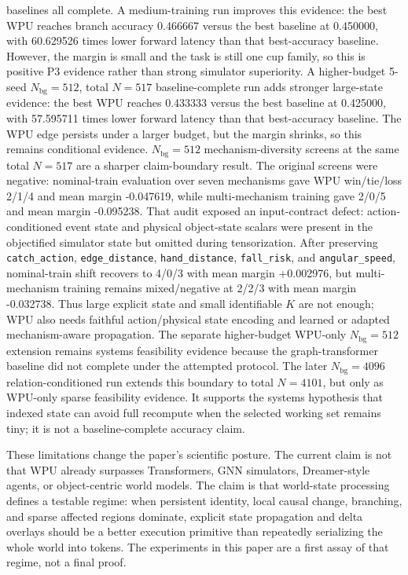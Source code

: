 \documentclass[11pt]{article}
\begin{document}
baselines all complete. A medium-training run improves this evidence: the best
WPU reaches branch accuracy 0.466667 versus the best baseline at 0.450000, with
60.629526 times lower forward latency than that best-accuracy baseline.
However, the margin is small and the task is still one cup family, so this is
positive P3 evidence rather than strong simulator superiority. A higher-budget
5-seed \(N_{\mathrm{bg}}=512\), total \(N=517\) baseline-complete run adds
stronger large-state evidence: the best WPU reaches 0.433333 versus the best
baseline at 0.425000, with 57.595711 times lower forward latency than that
best-accuracy baseline. The WPU edge persists under a larger budget, but the
margin shrinks, so this remains conditional evidence.
\(N_{\mathrm{bg}}=512\) mechanism-diversity screens at the same total \(N=517\)
are a sharper claim-boundary result. The original screens were negative:
nominal-train evaluation over seven mechanisms gave WPU win/tie/loss 2/1/4 and
mean margin -0.047619, while multi-mechanism training gave 2/0/5 and mean margin
-0.095238. That audit exposed an input-contract defect: action-conditioned
event state and physical object-state scalars were present in the objectified
simulator state but omitted during tensorization. After preserving
\texttt{catch\_action}, \texttt{edge\_distance}, \texttt{hand\_distance},
\texttt{fall\_risk}, and \texttt{angular\_speed}, nominal-train shift recovers
to 4/0/3 with mean margin +0.002976, but multi-mechanism training remains
mixed/negative at 2/2/3 with mean margin -0.032738. Thus large explicit state
and small identifiable \(K\) are not enough; WPU also needs faithful
action/physical state encoding and learned or adapted mechanism-aware
propagation. The separate higher-budget WPU-only \(N_{\mathrm{bg}}=512\)
extension remains systems feasibility evidence because the graph-transformer
baseline did not complete under the attempted protocol. The later
\(N_{\mathrm{bg}}=4096\) relation-conditioned run extends this boundary to
total \(N=4101\), but only as WPU-only sparse feasibility evidence. It supports
the systems hypothesis that indexed state can avoid full recompute when the
selected working set remains tiny; it is not a baseline-complete accuracy
claim.

These limitations change the paper's scientific posture. The current claim is
not that WPU already surpasses Transformers, GNN simulators, Dreamer-style
agents, or object-centric world models. The claim is that world-state processing
defines a testable regime: when persistent identity, local causal change,
branching, and sparse affected regions dominate, explicit state propagation and
delta overlays should be a better execution primitive than repeatedly
serializing the whole world into tokens. The experiments in this paper are a
first assay of that regime, not a final proof.
\end{document}
